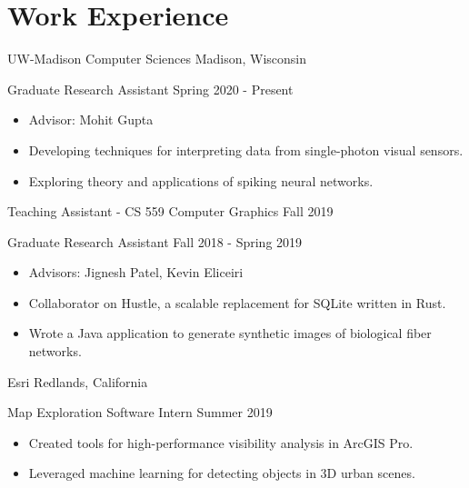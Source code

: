 \section*{Work Experience}

\begin{tab1} UW-Madison Computer Sciences \> Madison, Wisconsin \end{tab1}

\begin{tab2} Graduate Research Assistant \> Spring 2020 - Present \end{tab2}
\begin{itemize}
    \item Advisor: Mohit Gupta
    \item Developing techniques for interpreting data from single-photon visual sensors.
    \item Exploring theory and applications of spiking neural networks.
\end{itemize}

\begin{tab2} Teaching Assistant - CS 559 Computer Graphics \> Fall 2019 \end{tab2}

\begin{tab2} Graduate Research Assistant \> Fall 2018 - Spring 2019 \end{tab2}
\begin{itemize}
    \item Advisors: Jignesh Patel, Kevin Eliceiri
    \item Collaborator on Hustle, a scalable replacement for SQLite written in Rust.
    \item Wrote a Java application to generate synthetic images of biological fiber networks.
\end{itemize}

\blockskip

\begin{tab1} Esri \> Redlands, California \end{tab1}

\begin{tab2} Map Exploration Software Intern \> Summer 2019 \end{tab2}
\begin{itemize}
    \item Created tools for high-performance visibility analysis in ArcGIS Pro.
    \item Leveraged machine learning for detecting objects in 3D urban scenes.
\end{itemize}

